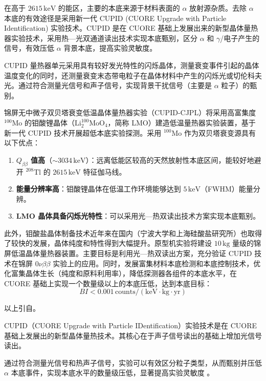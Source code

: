 \documentclass[type=master]{fduthesis}
\begin{document}
在高于 $2615\,\mathrm{keV}$ 的能区，主要的本底来源于材料表面的 $\alpha$ 放射源杂质。去除 $\alpha$ 本底的有效途径是采用新一代 CUPID (CUORE Upgrade with Particle Identification) 实验技术。CUPID 是在 CUORE 基础上发展出来的新型晶体量热器实验技术\cite{CUPID2015a,CUPID2015b,CUPID2019}，采用热—光双通道读出技术实现本底甄别，区分 $\alpha$ 和 $\gamma$/电子产生的信号，有效压低 $\alpha$ 背景本底，提高实验灵敏度。

CUPID 量热器单元采用具有较好发光特性的闪烁晶体，测量衰变事件引起的晶体温度变化的同时，还测量衰变末态带电粒子在晶体材料中产生的闪烁光或切伦科夫光。通过符合测量光信号和声子信号，实现背景干扰信号（主要是 $\alpha$ 粒子）的甄别。

锦屏无中微子双贝塔衰变低温晶体量热器实验（CUPID-CJPL）将采用高富集度 $^{100}\mathrm{Mo}$ 的钼酸锂晶体（$\mathrm{Li_2^{100}MoO_4}$，简称 LMO）建造低温量热器实验装置，基于新一代 CUPID 技术开展超低本底实验探测。采用 $^{100}\mathrm{Mo}$ 作为双贝塔衰变源具有以下优点：

\begin{enumerate}
    \item \textbf{$Q_{\beta\beta}$ 值高}（$\sim 3034\,\mathrm{keV}$）：远离低能区较高的天然放射性本底区间，能较好地避开 $^{208}\mathrm{Tl}$ 的 $2615\,\mathrm{keV}$ 特征伽马线。
    \item \textbf{能量分辨率高}：钼酸锂晶体在低温工作环境能够达到 $5\,\mathrm{keV}$（FWHM）能量分辨。
    \item \textbf{LMO 晶体具备闪烁光特性}：可以采用光—热双读出技术方案实现本底甄别。
\end{enumerate}

此外，钼酸盐晶体制备技术近年来在国内（宁波大学和上海硅酸盐研究所）也取得了较快的发展，晶体纯度和特性得到大幅提升。原型机实验将建设 $10\,\mathrm{kg}$ 量级的锦屏低温晶体量热器装置。主要目标是利用光—热双读出方案，充分验证 CUPID 技术在锦屏 $0\nu\beta\beta$ 实验上的应用。同时，发展富集材料本底检测和本底控制技术，优化富集晶体生长（纯度和原料利用率），降低探测器各组件的本底水平，在 CUORE 基础上实现一个数量级以上的本底压低，达到本底目标：
\[
BI < 0.001\,\mathrm{counts/(keV\cdot kg\cdot yr)}
\]

{\color{green} 以上引自}\cite{Ma2020Majorana}。

CUPID（CUORE Upgrade with Particle IDentification）实验技术是在 CUORE 基础上发展出的新型晶体量热技术。其核心在于声子信号读出的基础上增加光信号读出。

通过符合测量光信号和热声子信号，实验可以有效区分粒子类型，从而甄别并压低 $\alpha$ 本底事件，实现本底水平的数量级压低，显著提高实验灵敏度 \cite{CUPID_CDR, CUPID_CUORE, CUPID_RD}。
\end{document}
